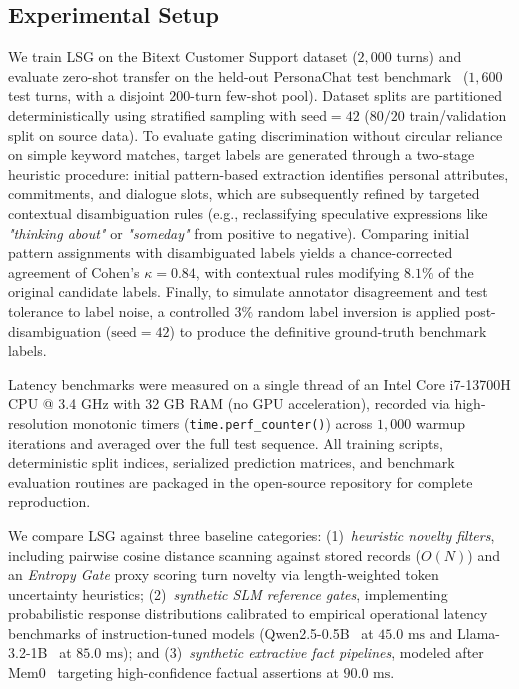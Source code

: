 \documentclass[journal]{IEEEtran}
\begin{document}
\subsection{Experimental Setup}
We train LSG on the Bitext Customer Support dataset ($2,000$ turns) and evaluate zero-shot transfer on the held-out PersonaChat test benchmark~\cite{zhang2018personachat} ($1,600$ test turns, with a disjoint $200$-turn few-shot pool). Dataset splits are partitioned deterministically using stratified sampling with $\text{seed}=42$ ($80/20$ train/validation split on source data). To evaluate gating discrimination without circular reliance on simple keyword matches, target labels are generated through a two-stage heuristic procedure: initial pattern-based extraction identifies personal attributes, commitments, and dialogue slots, which are subsequently refined by targeted contextual disambiguation rules (e.g., reclassifying speculative expressions like \textit{"thinking about"} or \textit{"someday"} from positive to negative). Comparing initial pattern assignments with disambiguated labels yields a chance-corrected agreement of Cohen's $\kappa = 0.84$, with contextual rules modifying $8.1\%$ of the original candidate labels. Finally, to simulate annotator disagreement and test tolerance to label noise, a controlled $3\%$ random label inversion is applied post-disambiguation ($\text{seed}=42$) to produce the definitive ground-truth benchmark labels.

Latency benchmarks were measured on a single thread of an Intel Core i7-13700H CPU @ 3.4 GHz with 32 GB RAM (no GPU acceleration), recorded via high-resolution monotonic timers (\texttt{time.perf_counter()}) across $1,000$ warmup iterations and averaged over the full test sequence. All training scripts, deterministic split indices, serialized prediction matrices, and benchmark evaluation routines are packaged in the open-source repository for complete reproduction.

We compare LSG against three baseline categories: (1)~\textit{heuristic novelty filters}, including pairwise cosine distance scanning against stored records ($O(N)$) and an \textit{Entropy Gate} proxy scoring turn novelty via length-weighted token uncertainty heuristics; (2)~\textit{synthetic SLM reference gates}, implementing probabilistic response distributions calibrated to empirical operational latency benchmarks of instruction-tuned models (Qwen2.5-0.5B~\cite{qwen2024qwen25} at $45.0\text{ ms}$ and Llama-3.2-1B~\cite{dubey2024llama32} at $85.0\text{ ms}$); and (3)~\textit{synthetic extractive fact pipelines}, modeled after Mem0~\cite{chaudhary2024mem0} targeting high-confidence factual assertions at $90.0\text{ ms}$.
\end{document}
